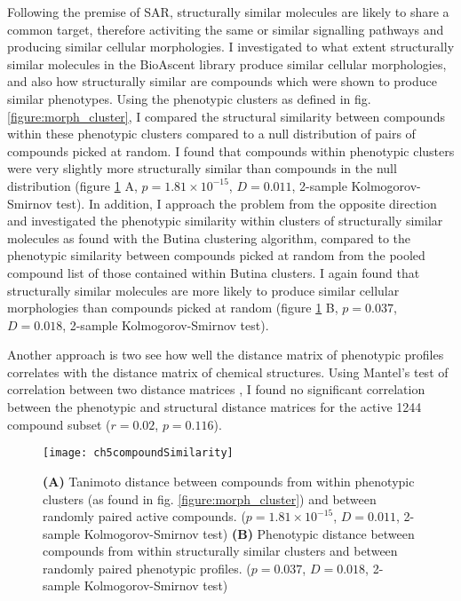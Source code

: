 \documentclass[a4paper,11pt,twoside,openright]{scrbook}
\begin{document}
Following the premise of SAR, structurally similar molecules are likely to share a common target, therefore activiting the same or similar signalling pathways and producing similar cellular morphologies.
I investigated to what extent structurally similar molecules in the BioAscent library produce similar cellular morphologies, and also how structurally similar are compounds which were shown to produce similar phenotypes.
Using the phenotypic clusters as defined in fig.\ref{figure:morph_cluster}, I compared the structural similarity between compounds within these phenotypic clusters compared to a null distribution of pairs of compounds picked at random.
I found that compounds within phenotypic clusters were very slightly more structurally similar than compounds in the null distribution (figure \ref{figure:compound_pheno_corr} A, $p=1.81\times10^{-15}$, $D=0.011$, 2-sample Kolmogorov-Smirnov test).
In addition, I approach the problem from the opposite direction and investigated the phenotypic similarity within clusters of structurally similar molecules as found with the Butina clustering algorithm, compared to the phenotypic similarity between compounds picked at random from the pooled compound list of those contained within Butina clusters.
I again found that structurally similar molecules are more likely to produce similar cellular morphologies than compounds picked at random (figure \ref{figure:compound_pheno_corr} B, $p=0.037$, $D=0.018$, 2-sample Kolmogorov-Smirnov test).

Another approach is two see how well the distance matrix of phenotypic profiles correlates with the distance matrix of chemical structures.
Using Mantel's test of correlation between two distance matrices \cite{Mantel1967}, I found no significant correlation between the phenotypic and structural distance matrices for the active 1244 compound subset ($r = 0.02$, $p = 0.116$).


\begin{figure}
    \captionsetup{width=0.8\textwidth}
    \caption[Comparison of structural and phenotypically similar compounds]{
        \textbf{(A)} Tanimoto distance between compounds from within phenotypic clusters (as found in fig. \ref{figure:morph_cluster}) and between randomly paired active compounds.
        ($p=1.81\times10^{-15}$, $D=0.011$, 2-sample Kolmogorov-Smirnov test)
    \textbf{(B)} Phenotypic distance between compounds from within structurally similar clusters and between randomly paired phenotypic profiles.
    ($p=0.037$, $D=0.018$, 2-sample Kolmogorov-Smirnov test)
}
    \texttt{[image: ch5compoundSimilarity]}
    \label{figure:compound_pheno_corr}
\end{figure}
\end{document}
